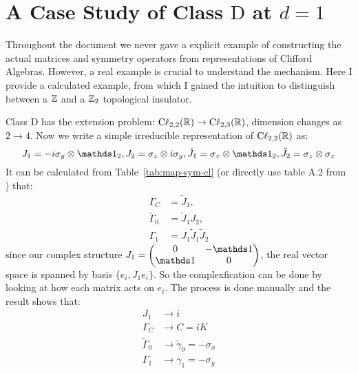 \section{A Case Study of Class \texorpdfstring{$\mathrm{D}$}{} at
\texorpdfstring{$d=1$}{}}
\label{sec:a case study}
Throughout the document we never gave a explicit example of constructing the
actual matrices and symmetry operators from representations of Clifford
Algebras. However, a real example is crucial to understand the mechanism. Here I
provide a calculated example, from which I gained the intuition to distinguish
between a $\mathbb{Z}$ and a $\mathbb{Z}_2$ topological insulator.

Class $\mathrm{D}$ has the extension problem: $\mathrm{C\ell}_{2,2}(\mathbb{R})\to
\mathrm{C\ell}_{2,3}(\mathbb{R})$, dimension changes as $2\to 4$. Now we write a simple
irreducible representation of $\mathrm{C\ell}_{2,2}(\mathbb{R})$ as:
\begin{equation}
    \label{eq:old-realified-J}
    J_1 = -i\sigma_y\otimes \id_2,
    J_2 = \sigma_z\otimes i\sigma_y,
    \tilde{J}_1 = \sigma_x\otimes \id_2,
    \tilde{J}_2 = \sigma_z\otimes \sigma_x
\end{equation}
It can be calculated from Table~\ref{tab:map-sym-cl} (or directly use table A.2
from \cite{Chiu2013a}) that:
\begin{equation}
\begin{aligned}
    \Gamma_C &= \tilde{J}_1,\\
    \tilde{\Gamma}_0 &= \tilde{J}_1 J_2,\\
    \Gamma_1 &=J_1\tilde{J}_1\tilde{J}_2
\end{aligned}
\end{equation}
since our complex structure $J_1= \begin{pmatrix}
    0 & -\id \\ \id & 0
\end{pmatrix}$, the real vector space is spanned by basis $\{e_i, J_1 e_i\}$. So
the complexfication can be done by looking at how each matrix acts on $e_i$. The
process is done manually and the result shows that:
\begin{equation}
\begin{aligned}
    J_1 &\to i \\
    \Gamma_C &\to C = iK \\
    \tilde{\Gamma}_0 &\to \tilde{\gamma}_0 = -\sigma_x \\
    {\Gamma}_1 &\to {\gamma}_1 = -\sigma_y
\end{aligned}
\end{equation}
